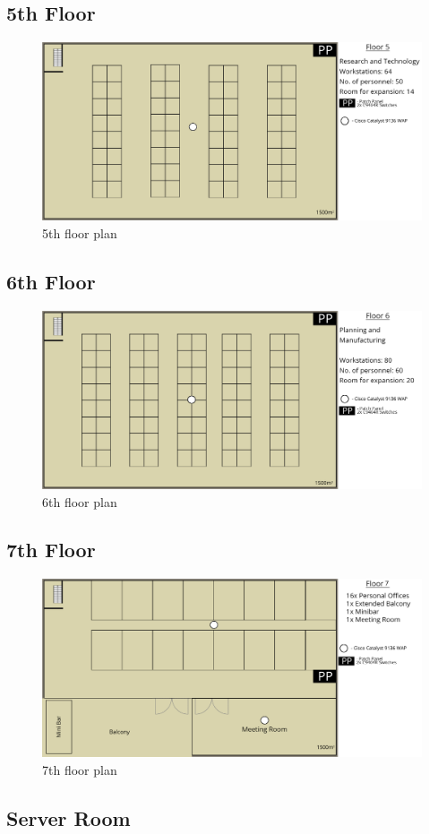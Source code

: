 \subsection{5th Floor}
\begin{figure}[H]
    \includegraphics[width=15cm]{Figures/5th-Floor.png}
    \caption{5th floor plan}
    \label{fig:5th_floor}
\end{figure}
\subsection{6th Floor}
\begin{figure}[H]
    \includegraphics[width=15cm]{Figures/6th-Floor.png}
    \caption{6th floor plan}
    \label{fig:6th_floor}
\end{figure}
\subsection{7th Floor}
\begin{figure}[H]
    \includegraphics[width=15cm]{Figures/7th-floor.png}
    \caption{7th floor plan}
    \label{fig:7th_floor}
\end{figure}
\subsection{Server Room}
